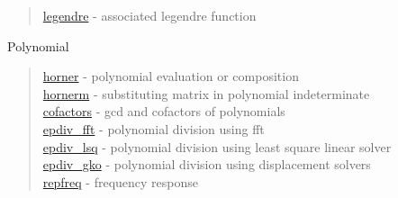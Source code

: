 \begin{quote}
\noindent
\hyperlink{legendre}{legendre} - associated legendre function\\
\end{quote}

Polynomial

\begin{quote}
\noindent
\hyperlink{horner}{horner} - polynomial evaluation or composition \\
\hyperlink{hornerm}{hornerm} - substituting matrix in polynomial indeterminate \\
\hyperlink{cofactors}{cofactors} - gcd and cofactors of polynomials \\
\hyperlink{epdiv_fft}{epdiv\_fft} - {polynomial division using fft}\\
\hyperlink{epdiv_lsq}{epdiv\_lsq} - {polynomial division using least square linear solver}\\
\hyperlink{epdiv_gko}{epdiv\_gko} - { polynomial division using displacement solvers}\\
\hyperlink{repfreq}{repfreq} - {frequency response} \\
\end{quote}














